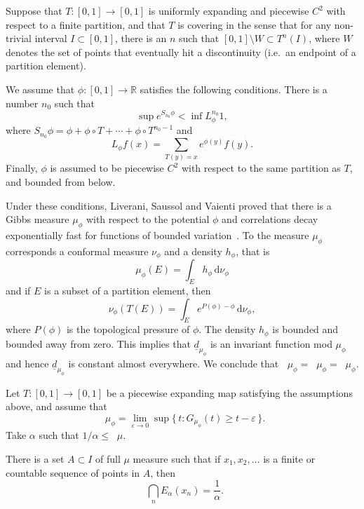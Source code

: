 \documentclass[AHL,Unicode,longabstracts]{cedram}
\DeclareMathOperator{\dimh}{dim_H}
\DeclareMathOperator{\ldimh}{\underline{dim}_H}
\DeclareMathOperator{\udimh}{\overline{dim}_H}
\newcommand*{\dimh}{\mathrm{dim}_{\mathrm{H}}}
\newcommand*{\dd}{\mathrm{d}}
\begin{document}
Suppose that $T \colon [0,1] \to [0,1]$ is uniformly expanding and piecewise $C^2$ with respect to a finite partition, and that $T$ is covering in the sense that for any non-trivial interval $I \subset [0,1]$, there is an $n$ such that $[0,1] \setminus W \subset T^n (I)$, where $W$ denotes the set of points that eventually hit a discontinuity (i.e.\ an endpoint of a partition element).

We assume that $\phi \colon [0,1] \to \mathbb{R}$ satisfies the following conditions. There is a number $n_0$ such that
\[
\sup e^{S_{n_0} \phi} < \inf L_\phi^{n_0} 1,
\]
where $S_{n_0} \phi = \phi + \phi \circ T + \cdots + \phi \circ T^{n_0-1}$ and
\[
L_\phi f (x) = \sum_{T(y) = x} e^{\phi (y)} f(y).
\]
Finally, $\phi$ is assumed to be piecewise $C^2$ with respect to the same partition as $T$, and bounded from below.

Under these conditions, Liverani, Saussol and Vaienti proved that there is a Gibbs measure $\mu_\phi$ with respect to the potential $\phi$ and correlations decay exponentially fast for functions of bounded variation~\cite[Theorem~3.1]{liveranietal}. To the measure $\mu_\phi$ corresponds a conformal measure $\nu_\phi$ and a density $h_\phi$, that is
\[
\mu_\phi (E) = \int_E h_\phi \, \dd\nu_\phi
\]
and if $E$ is a subset of a partition element, then
\[
\nu_\phi (T(E)) = \int_E e^{P(\phi) - \phi} \, \dd \nu_\phi,
\]
where $P(\phi)$ is the topological pressure of $\phi$. The density $h_\phi$ is bounded and bounded away from zero. This implies that $\underline{d}_{\mu_\phi}$ is an invariant function mod $\mu_\phi$ and hence $\underline{d}_{\mu_\phi}$ is constant almost everywhere. We conclude that $\dimh \mu_\phi = \ldimh \mu_\phi = \udimh \mu_\phi$.

\begin{coro}\label{cor:piecewise}
Let $T \colon [0,1] \to [0,1]$ be a piecewise expanding map satisfying the assumptions above, and assume that
\begin{equation}\label{eq:dim-coarse}
\dimh \mu_\phi = \lim_{\varepsilon \to 0} \sup \{\, t : G_{\mu_\phi} (t) \geq t - \varepsilon \,\}.
\end{equation}
Take $\alpha$ such that $1/\alpha \leq \dimh \mu$.

There is a set $A \subset I$ of full $\mu$ measure such that if $x_1, x_2, \ldots$ is a finite or countable sequence of points in $A$, then
\[
\dimh \bigcap_n E_\alpha (x_n) = \frac{1}{\alpha}.
\]
\end{coro}
\end{document}

